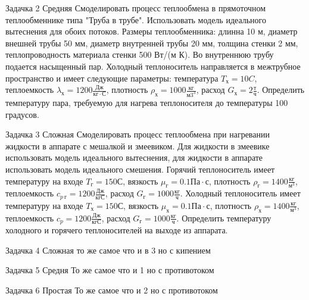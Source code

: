 Задачка 2 Средняя
Смоделировать процесс теплообмена в прямоточном теплообменнике типа "Труба в трубе". Использовать модель идеального вытеснения для обоих потоков. Размеры теплообменника: длинна 10 м, диаметр внешней трубы 50 мм, диаметр внутренней трубы 20 мм, толщина стенки 2 мм, теплопроводность материала стенки 500 Вт/(м К). Во внутреннюю трубу подается насыщенный пар. Холодный теплоноситель направляется в межтрубное пространство и имеет следующие параметры: температура $T_х=10 C$, теплоемкость $\lambda_х=1200\frac{Дж}{кг \cdot С}$, плотность $\rho_х=1000 \frac{кг}{м3^3}$, расход $G_х=2 \frac{т}{ч}$.
Определить температуру пара, требуемую для нагрева теплоносителя до температуры 100 градусов. 

Задачка 3 Сложная
Смоделировать процесс теплообмена при нагревании жидкости в аппарате с мешалкой и змеевиком. Для жидкости в змеевике использовать модель идеального вытеснения, для жидкости в аппарате использовать модель идеального смешения. Горячий теплоноситель имеет температуру на входе $T_г=150 С$, вязкость $\mu_г=0.1 Па\cdot с$, плотность  $\rho_г= 1400 \frac{кг}{м^3}$, теплоемкость $c_{p\ г}=1200 \frac{Дж}{кг С}$, расход $G_г=1000 \frac{кг}{ч}$. Холодный теплоноситель имеет температуру на входе $T_х=150 С$, вязкость $\mu_х=0.1 Па\cdot с$, плотность  $\rho_х= 1400 \frac{кг}{м^3}$, теплоемкость $c_p=1200 \frac{Дж}{кг С}$, расход $G_г=1000 \frac{кг}{ч}$. Определить температуру холодного и горячего теплоносителей на выходе из аппарата.

Задачка 4 Сложная то же самое что и в 3 но с кипением

Задачка 5 Средня То же самое что и 1 но с противотоком

Задачка 6 Простая То же самое что и 2 но с противотоком


